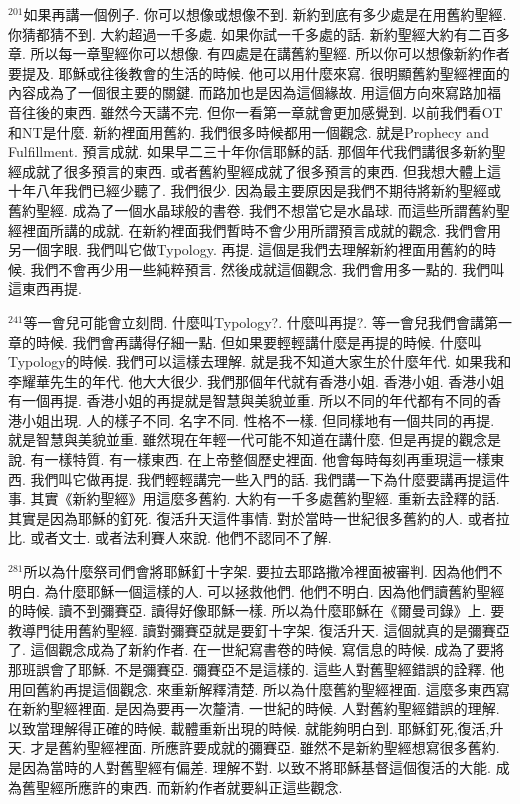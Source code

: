 \documentclass{book}
\begin{document}
$^{201}$如果再講一個例子.
你可以想像或想像不到.
新約到底有多少處是在用舊約聖經.
你猜都猜不到.
大約超過一千多處.
如果你試一千多處的話.
新約聖經大約有二百多章.
所以每一章聖經你可以想像.
有四處是在講舊約聖經.
所以你可以想像新約作者要提及.
耶穌或往後教會的生活的時候.
他可以用什麼來寫.
很明顯舊約聖經裡面的內容成為了一個很主要的關鍵.
而路加也是因為這個緣故.
用這個方向來寫路加福音往後的東西.
雖然今天講不完.
但你一看第一章就會更加感覺到.
以前我們看OT和NT是什麼.
新約裡面用舊約.
我們很多時候都用一個觀念.
就是Prophecy and Fulfillment.
預言成就.
如果早二三十年你信耶穌的話.
那個年代我們講很多新約聖經成就了很多預言的東西.
或者舊約聖經成就了很多預言的東西.
但我想大體上這十年八年我們已經少聽了.
我們很少.
因為最主要原因是我們不期待將新約聖經或舊約聖經.
成為了一個水晶球般的書卷.
我們不想當它是水晶球.
而這些所謂舊約聖經裡面所講的成就.
在新約裡面我們暫時不會少用所謂預言成就的觀念.
我們會用另一個字眼.
我們叫它做Typology.
再提.
這個是我們去理解新約裡面用舊約的時候.
我們不會再少用一些純粹預言.
然後成就這個觀念.
我們會用多一點的.
我們叫這東西再提.

$^{241}$等一會兒可能會立刻問.
什麼叫Typology?.
什麼叫再提?.
等一會兒我們會講第一章的時候.
我們會再講得仔細一點.
但如果要輕輕講什麼是再提的時候.
什麼叫Typology的時候.
我們可以這樣去理解.
就是我不知道大家生於什麼年代.
如果我和李耀華先生的年代.
他大大很少.
我們那個年代就有香港小姐.
香港小姐.
香港小姐有一個再提.
香港小姐的再提就是智慧與美貌並重.
所以不同的年代都有不同的香港小姐出現.
人的樣子不同.
名字不同.
性格不一樣.
但同樣地有一個共同的再提.
就是智慧與美貌並重.
雖然現在年輕一代可能不知道在講什麼.
但是再提的觀念是說.
有一樣特質.
有一樣東西.
在上帝整個歷史裡面.
他會每時每刻再重現這一樣東西.
我們叫它做再提.
我們輕輕講完一些入門的話.
我們講一下為什麼要講再提這件事.
其實《新約聖經》用這麼多舊約.
大約有一千多處舊約聖經.
重新去詮釋的話.
其實是因為耶穌的釘死.
復活升天這件事情.
對於當時一世紀很多舊約的人.
或者拉比.
或者文士.
或者法利賽人來說.
他們不認同不了解.

$^{281}$所以為什麼祭司們會將耶穌釘十字架.
要拉去耶路撒冷裡面被審判.
因為他們不明白.
為什麼耶穌一個這樣的人.
可以拯救他們.
他們不明白.
因為他們讀舊約聖經的時候.
讀不到彌賽亞.
讀得好像耶穌一樣.
所以為什麼耶穌在《爾曼司錄》上.
要教導門徒用舊約聖經.
讀對彌賽亞就是要釘十字架.
復活升天.
這個就真的是彌賽亞了.
這個觀念成為了新約作者.
在一世紀寫書卷的時候.
寫信息的時候.
成為了要將那班誤會了耶穌.
不是彌賽亞.
彌賽亞不是這樣的.
這些人對舊聖經錯誤的詮釋.
他用回舊約再提這個觀念.
來重新解釋清楚.
所以為什麼舊約聖經裡面.
這麼多東西寫在新約聖經裡面.
是因為要再一次釐清.
一世紀的時候.
人對舊約聖經錯誤的理解.
以致當理解得正確的時候.
載體重新出現的時候.
就能夠明白到.
耶穌釘死,復活,升天.
才是舊約聖經裡面.
所應許要成就的彌賽亞.
雖然不是新約聖經想寫很多舊約.
是因為當時的人對舊聖經有偏差.
理解不對.
以致不將耶穌基督這個復活的大能.
成為舊聖經所應許的東西.
而新約作者就要糾正這些觀念.
\end{document}
